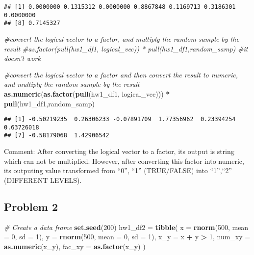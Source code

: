 \documentclass[]{article}
\newenvironment{Shaded}{\begin{snugshade}}{\end{snugshade}}
\newcommand{\CommentTok}[1]{\textcolor[rgb]{0.56,0.35,0.01}{\textit{#1}}}
\newcommand{\DataTypeTok}[1]{\textcolor[rgb]{0.13,0.29,0.53}{#1}}
\newcommand{\DecValTok}[1]{\textcolor[rgb]{0.00,0.00,0.81}{#1}}
\newcommand{\KeywordTok}[1]{\textcolor[rgb]{0.13,0.29,0.53}{\textbf{#1}}}
\newcommand{\NormalTok}[1]{#1}
\newcommand{\OperatorTok}[1]{\textcolor[rgb]{0.81,0.36,0.00}{\textbf{#1}}}
\newcommand{\StringTok}[1]{\textcolor[rgb]{0.31,0.60,0.02}{#1}}
\begin{document}
\begin{verbatim}
## [1] 0.0000000 0.1315312 0.0000000 0.8867848 0.1169713 0.3186301 0.0000000
## [8] 0.7145327
\end{verbatim}

\begin{Shaded}
\begin{Highlighting}[]
\CommentTok{#convert the logical vector to a factor, and multiply the random sample by the result}
\CommentTok{#as.factor(pull(hw1_df1, logical_vec)) * pull(hw1_df1,random_samp)}
\CommentTok{#it doesn't work}

\CommentTok{#convert the logical vector to a factor and then convert the result to numeric, and multiply the random sample by the result}
\KeywordTok{as.numeric}\NormalTok{(}\KeywordTok{as.factor}\NormalTok{(}\KeywordTok{pull}\NormalTok{(hw1_df1, logical_vec))) }\OperatorTok{*}\StringTok{ }\KeywordTok{pull}\NormalTok{(hw1_df1,random_samp)}
\end{Highlighting}
\end{Shaded}

\begin{verbatim}
## [1] -0.50219235  0.26306233 -0.07891709  1.77356962  0.23394254  0.63726018
## [7] -0.58179068  1.42906542
\end{verbatim}

Comment: After converting the logical vector to a factor, its output is
string which can not be multiplied. However, after converting this
factor into numeric, its outputing value transformed from ``0'', ``1''
(TRUE/FALSE) into ``1'',``2'' (DIFFERENT LEVELS).

\hypertarget{problem-2}{%
\subsection{Problem 2}\label{problem-2}}

\begin{Shaded}
\begin{Highlighting}[]
\CommentTok{# Create a data frame}
\KeywordTok{set.seed}\NormalTok{(}\DecValTok{200}\NormalTok{)}
\NormalTok{hw1_df2 =}\StringTok{ }\KeywordTok{tibble}\NormalTok{(}
  \DataTypeTok{x =} \KeywordTok{rnorm}\NormalTok{(}\DecValTok{500}\NormalTok{, }\DataTypeTok{mean =} \DecValTok{0}\NormalTok{, }\DataTypeTok{sd =} \DecValTok{1}\NormalTok{),}
  \DataTypeTok{y =} \KeywordTok{rnorm}\NormalTok{(}\DecValTok{500}\NormalTok{, }\DataTypeTok{mean =} \DecValTok{0}\NormalTok{, }\DataTypeTok{sd =} \DecValTok{1}\NormalTok{),}
  \DataTypeTok{x_y =}\NormalTok{ x }\OperatorTok{+}\StringTok{ }\NormalTok{y }\OperatorTok{>}\StringTok{ }\DecValTok{1}\NormalTok{,}
  \DataTypeTok{num_xy =} \KeywordTok{as.numeric}\NormalTok{(x_y),}
  \DataTypeTok{fac_xy =} \KeywordTok{as.factor}\NormalTok{(x_y)}
\NormalTok{)}
\end{Highlighting}
\end{Shaded}
\end{document}
